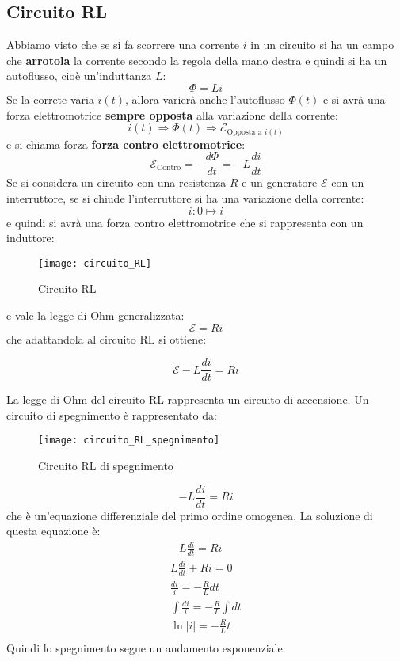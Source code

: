 \documentclass[a4paper]{article}
\begin{document}
\subsection{Circuito RL}
Abbiamo visto che se si fa scorrere una corrente \( i \) in un circuito si ha un campo
che \textbf{arrotola} la corrente secondo la regola della mano destra e quindi si ha
un autoflusso, cioè un'induttanza \( L \):
\[
  \Phi = Li
\] 
Se la correte varia \( i(t) \), allora varierà anche l'autoflusso \( \Phi(t) \) e si
avrà una forza elettromotrice \textbf{sempre opposta} alla variazione della corrente:
\[
  i(t) \Rightarrow \Phi(t) \Rightarrow \mathcal{E}_{\text{Opposta a } i(t)}
\] 
e si chiama forza \textbf{forza contro elettromotrice}:
\[
  \mathcal{E}_{\text{Contro}} = - \frac{d \Phi }{dt} = - L \frac{di}{dt}
\] 
Se si considera un circuito con una resistenza \( R \) e un generatore \( \mathcal{E} \)
con un interruttore, se si chiude l'interruttore si ha una variazione della corrente:
\[
  i: 0 \mapsto i
\] 
e quindi si avrà una forza contro elettromotrice che si rappresenta con un induttore:
\begin{figure}[H]
  \centering
  \texttt{[image: circuito\_RL]}
  \caption{Circuito RL}
\end{figure}
\noindent
e vale la legge di Ohm generalizzata:
\[
  \mathcal{E} = Ri
\] 
che adattandola al circuito RL si ottiene: 
\begin{definition}
  \[
    \mathcal{E} - L \frac{di}{dt} = Ri
  \] 
\end{definition}
La legge di Ohm del circuito RL rappresenta un circuito di accensione. Un circuito di
spegnimento è rappresentato da:
\begin{figure}[H]
  \centering
  \texttt{[image: circuito\_RL\_spegnimento]}
  \caption{Circuito RL di spegnimento}
\end{figure}
\[
  - L \frac{di}{dt} = Ri
\] 
che è un'equazione differenziale del primo ordine omogenea. La soluzione di questa
equazione è:
\[
  \begin{aligned}
    - L \frac{di}{dt} = Ri\\
    L \frac{di}{dt} + Ri = 0\\
    \frac{di}{i} = - \frac{R}{L} dt\\
    \int \frac{di}{i} = - \frac{R}{L} \int dt\\
    \ln |i| = - \frac{R}{L} t\\
  \end{aligned}
\] 
Quindi lo spegnimento segue un andamento esponenziale:
\end{document}
